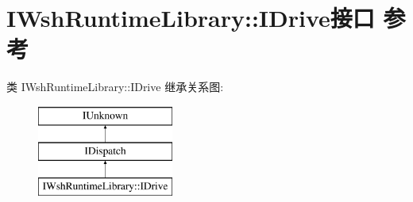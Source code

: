 \hypertarget{interface_i_wsh_runtime_library_1_1_i_drive}{}\section{I\+Wsh\+Runtime\+Library\+:\+:I\+Drive接口 参考}
\label{interface_i_wsh_runtime_library_1_1_i_drive}
类 I\+Wsh\+Runtime\+Library\+:\+:I\+Drive 继承关系图\+:\begin{figure}[H]
\begin{center}
\leavevmode
\includegraphics[height=3.000000cm]{interface_i_wsh_runtime_library_1_1_i_drive}
\end{center}
\end{figure}
